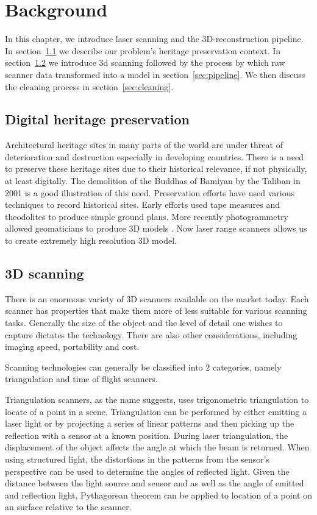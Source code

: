 \chapter{Background} \label{ch:background}

In this chapter, we introduce laser scanning and the 3D-reconstruction pipeline. In section~\ref{sec:heritage} we describe our problem's heritage preservation context. In section~\ref{sec:scanners} we introduce 3d scanning followed by the process by which raw scanner data transformed into a model in section~\ref{sec:pipeline}. We then discuss the cleaning process in section~\ref{sec:cleaning}.




\section{Digital heritage preservation} \label{sec:heritage}

Architectural heritage sites in many parts of the world are under threat of deterioration and destruction especially in developing countries. There is a need to preserve these heritage sites due to their historical relevance, if not physically, at least digitally. The demolition of  the Buddhas of Bamiyan by the Taliban in 2001 \cite{Toubekis2009} is a good illustration of this need. Preservation efforts have used various techniques to record historical sites. Early efforts used tape measures and theodolites to produce simple ground plans. More recently photogrammetry allowed geomaticians to produce 3D models \cite{Heritage}. Now laser range scanners allows us to create extremely high resolution 3D model.


\section{3D scanning} \label{sec:scanners}

There is an enormous variety of 3D scanners available on the market today. Each scanner has properties that make them more of less suitable for various scanning tasks. Generally the size of the object and the level of detail one wishes to capture dictates the technology. There are also other considerations, including imaging speed, portability and cost.

Scanning technologies can generally be classified into 2 categories, namely triangulation and time of flight scanners.

Triangulation scanners, as the name suggests, uses trigonometric triangulation to locate of a point in a scene. Triangulation can be performed by either emitting a laser light or by projecting a series of linear patterns and then picking up the reflection with a sensor at a known position. During laser triangulation, the displacement of the object affects the angle at which the beam is returned. When using structured light, the distortions in the patterns from the sensor's perspective can be used to determine the angles of reflected light. Given the distance between the light source and sensor and as well as the angle of emitted and reflection light, Pythagorean theorem can be applied to location of a point on an surface relative to the scanner.

